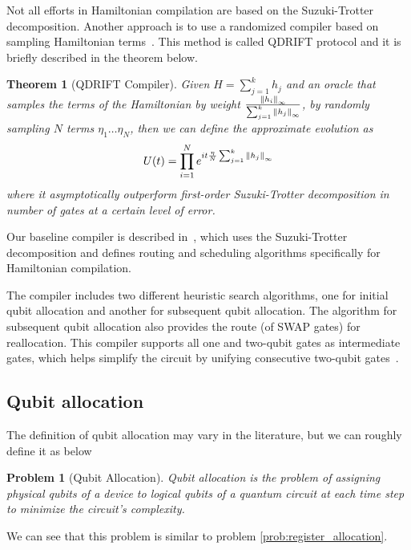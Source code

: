 \documentclass{report}
\newtheorem{theorem}{Theorem}
\newtheorem{problem}{Problem}
\begin{document}
Not all efforts in Hamiltonian compilation are based on the Suzuki-Trotter decomposition. Another approach is to use a randomized compiler based on sampling Hamiltonian terms~\cite{campbell2019}. This method is called QDRIFT protocol and it is briefly described in the theorem below.

\begin{theorem}[QDRIFT Compiler]
  Given $H = \sum_{j=1}^k h_j$ and an oracle that samples the terms of the Hamiltonian by weight $\frac{\norm{h_i}_\infty}{\sum_{j=1}^k \norm{h_j}_\infty}$, by randomly sampling $N$ terms $\eta_1 \dots \eta_N$, then we can define the approximate evolution as
  \begin{equation}
    U(t) = \prod_{i=1}^N e^{it\frac{\eta}{N}\sum_{j=1}^k \norm{h_j}_\infty}
  \end{equation}
  where it asymptotically outperform first-order Suzuki-Trotter decomposition in number of gates at a certain level of error.
\end{theorem}

Our baseline compiler is described in~\cite{lao2021}, which uses the Suzuki-Trotter decomposition and defines routing and scheduling algorithms specifically for Hamiltonian compilation.

The compiler includes two different heuristic search algorithms, one for initial qubit allocation and another for subsequent qubit allocation. The algorithm for subsequent qubit allocation also provides the route (of SWAP gates) for reallocation. This compiler supports all one and two-qubit gates as intermediate gates, which helps simplify the circuit by unifying consecutive two-qubit gates~\cite{lao2021}.



\subsection{Qubit allocation}


The definition of qubit allocation may vary in the literature, but we can roughly define it as below

\begin{problem}[Qubit Allocation]
  Qubit allocation is the problem of assigning physical qubits of a device to logical qubits of a quantum circuit at each time step to minimize the circuit's complexity.
\end{problem}

We can see that this problem is similar to problem \ref{prob:register_allocation}.
\end{document}
